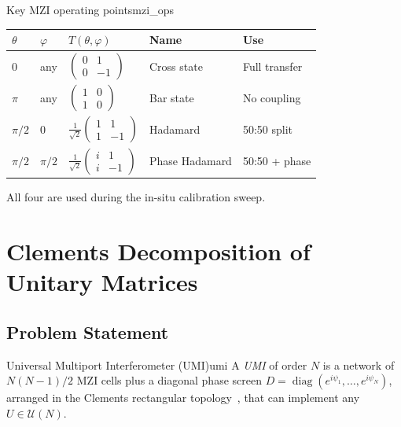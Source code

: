\documentclass[12pt, a4paper]{article}
\newcommand{\calU}{\mathcal{U}}
\newcommand{\diag}{\operatorname{diag}}
\begin{document}
\begin{example}{Key MZI operating points}{mzi_ops}
  \begin{center}
  \begin{tabular}{lllll}
  \toprule
  $\theta$ & $\varphi$ & $T(\theta,\varphi)$ & Name & Use \\
  \midrule
  $0$ & any & $\begin{pmatrix}0&1\\0&-1\end{pmatrix}$ & Cross state & Full transfer \\
  $\pi$ & any & $\begin{pmatrix}1&0\\1&0\end{pmatrix}$ & Bar state & No coupling \\
  $\pi/2$ & $0$ & $\frac{1}{\sqrt{2}}\begin{pmatrix}1&1\\1&-1\end{pmatrix}$ & Hadamard & 50:50 split \\
  $\pi/2$ & $\pi/2$ & $\frac{1}{\sqrt{2}}\begin{pmatrix}i&1\\i&-1\end{pmatrix}$ & Phase Hadamard & 50:50 + phase \\
  \bottomrule
  \end{tabular}
  \end{center}
  All four are used during the in-situ calibration sweep.
\end{example}

\section{Clements Decomposition of Unitary Matrices}
\label{sec:clements}

\subsection{Problem Statement}

\begin{definition}{Universal Multiport Interferometer (UMI)}{umi}
  A \emph{UMI} of order $N$ is a network of $N(N-1)/2$ MZI cells plus a
  diagonal phase screen $D=\diag(e^{i\psi_1},\ldots,e^{i\psi_N})$,
  arranged in the Clements rectangular topology~\cite{clements2016},
  that can implement any $U\in\calU(N)$.
\end{definition}
\end{document}
